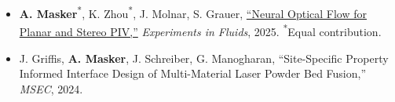 \begin{itemize}[leftmargin=22pt, noitemsep, topsep=0pt, partopsep=0pt, parsep=0pt]
    \item[J1.] \textbf{A. Masker}\textsuperscript{*}, K. Zhou\textsuperscript{*}, J. Molnar, S. Grauer, \href{https://doi.org/10.1007/s00348-025-04058-1}{``Neural Optical Flow for Planar and Stereo PIV,''} \textit{Experiments in Fluids}, 2025. \textsuperscript{*}Equal contribution.

    \item[C1.] J. Griffis, \textbf{A. Masker}, J. Schreiber, G. Manogharan, ``Site-Specific Property Informed Interface Design of Multi-Material Laser Powder Bed Fusion,'' \textit{MSEC}, 2024.

\end{itemize}
